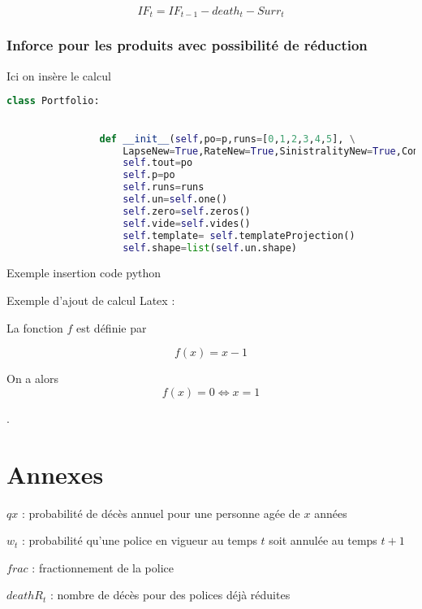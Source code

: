 \documentclass{article}
\begin{document}
\begin{equation}
IF_{t} = IF_{t-1} - death_t - Surr_t
\end{equation} 

		\subsubsection{Inforce pour les produits avec possibilité de réduction}
		Ici on insère le calcul 

			\begin{lstlisting}[language=Python]
			class Portfolio:
    

    			def __init__(self,po=p,runs=[0,1,2,3,4,5], \
                    LapseNew=True,RateNew=True,SinistralityNew=True,CommissionNew=True,CostNew=True):
        			self.tout=po    
        			self.p=po
        			self.runs=runs
        			self.un=self.one()
        			self.zero=self.zeros()
        			self.vide=self.vides()
        			self.template= self.templateProjection()
        			self.shape=list(self.un.shape)

			\end{lstlisting}
			Exemple insertion code python	
			
			Exemple d'ajout de calcul Latex :

La fonction $f$ est définie par

\begin{equation}
  f(x) = x-1
\end{equation}

On a alors
\begin{equation}
   f(x) = 0 \iff x = 1
\end{equation}



\newpage. 
    
\appendix

\section{Annexes}

\noindent $qx$ : probabilité de décès annuel pour une personne agée de $x$ années

\noindent $w_t$ : probabilité qu'une police en vigueur au temps $t$ soit annulée au temps $t+1$

\noindent $frac$ : fractionnement de la police

\noindent $deathR_t$ : nombre de décès pour des polices déjà réduites

\noindent

\noindent

\noindent

\noindent

\noindent

\noindent
\end{document}
